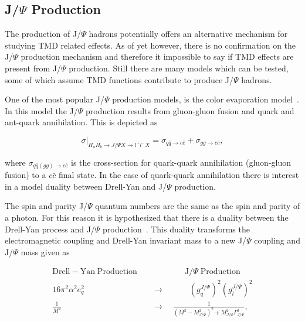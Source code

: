 \subsection{J/$\Psi$ Production}
The production of J/$\Psi$ hadrons potentially offers an alternative mechanism
for studying TMD related effects.  As of yet however, there is no confirmation
on the J/$\Psi$ production mechanism and therefore it impossible to say if TMD
effects are present from J/$\Psi$ production.  Still there are many models which can
be tested, some of which assume TMD functions contribute to produce J/$\Psi$
hadrons.

One of the most popular J/$\Psi$ production models, is the color evaporation
model~\cite{VOGT1999197}.  In this model the J/$\Psi$ production results from
gluon-gluon fusion and quark and ant-quark annihilation.  This is depicted as

\begin{equation}
  \sigma \Big |_{H_aH_b\rightarrow J/\Psi X \rightarrow l^+l^- X}
  = \sigma_{q\bar{q}\rightarrow c\bar{c}} + \sigma_{gg\rightarrow c\bar{c}},
\end{equation}

\noindent
where $\sigma_{q\bar{q}(gg)\rightarrow c\bar{c}}$ is the cross-section for
quark-quark annihilation (gluon-gluon fusion) to a $c\bar{c}$ final state.  In
the case of quark-quark annihilation there is interest in a model duality
between Drell-Yan and J/$\Psi$ production.

The spin and parity J/$\Psi$ quantum numbers are the same as the spin and parity
of a photon.  For this reason it is hypothesized that there is a duality between
the Drell-Yan process and J/$\Psi$
production~\cite{Anselmino:2004ki,Barone2007,Sissakian:2008th}.  This duality
transforms the electromagnetic coupling and Drell-Yan invariant mass to a new
J/$\Psi$ coupling and J/$\Psi$ mass given as

\begin{align}
  \nonumber
  \mathrm{Drell-}\mathrm{Yan}\; \mathrm{Production} \quad &
  \quad\quad\quad\quad \mathrm{J/}\Psi \;\mathrm{Production}
  \\
  \label{equ::dualityJPsi_coupling}
  16\pi^2\alpha^2e_q^2 \quad &\rightarrow
  \quad \quad\quad (g_q^{J/\Psi})^2(g_l^{J/\Psi})^2
  \\
  \label{equ::dualityJPsi_mass}
  \frac{1}{M^4} \quad \quad &\rightarrow \quad
  \frac{1}{(M^2-M^2_{J/\Psi})^2 + M^2_{J/\Psi}\Gamma^2_{J/\Psi}},
\end{align}

